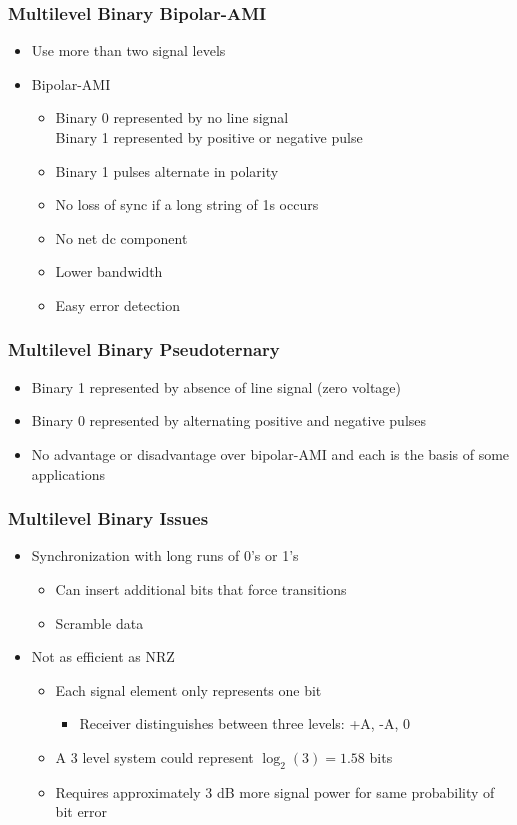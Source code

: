 \documentclass[pdflatex,compress]{beamer}
\begin{document}
\begin{frame}
	\frametitle{Multilevel Binary Bipolar-AMI}
	\begin{itemize}
		\item Use more than two signal levels
		\item Bipolar-AMI
		\begin{itemize}
			\item Binary 0 represented by no line signal\\
			Binary 1 represented by positive or negative pulse
			\item Binary 1 pulses alternate in polarity
			\item No loss of sync if a long string of 1s occurs
			\item No net dc component
			\item Lower bandwidth
			\item Easy error detection
		\end{itemize}
	\end{itemize}
\end{frame}

\begin{frame}
	\frametitle{Multilevel Binary Pseudoternary}
	\begin{itemize}
		\item Binary 1 represented by absence of line
		signal (zero voltage)
		\item Binary 0 represented by alternating positive and negative pulses
		\item No advantage or disadvantage over bipolar-AMI and each is the basis of some applications
	\end{itemize}
\end{frame}

\begin{frame}
	\frametitle{Multilevel Binary Issues}
	\begin{itemize}
		\item Synchronization with long runs of 0’s or 1’s
		\begin{itemize}
			\item Can insert additional bits that force transitions
			\item Scramble data
		\end{itemize}
		\item Not as efficient as NRZ
		\begin{itemize}
			\item Each signal element only represents one bit
			\begin{itemize}
				\item Receiver distinguishes between three levels: +A, -A, 0
			\end{itemize}
			\item A 3 level system could represent $ \log_2 (3) = 1.58 $ bits
			\item Requires approximately 3 dB more signal power for same probability of bit error
		\end{itemize}
	\end{itemize}
\end{frame}
\end{document}
